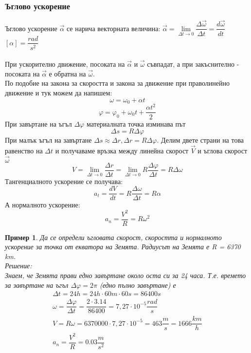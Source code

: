 \documentclass[fleqn, 12pt]{article}
\newtheorem{example}{Пример}[subsection]
\begin{document}
\subsubsection{Ъглово ускорение}
Ъглово ускорение $\vec{\alpha}$ се нарича векторната величина: $\vec{\alpha} = \lim\limits_{\Delta t \rightarrow 0} \dfrac{\Delta \vec{\omega}}{\Delta t} = \dfrac{d \vec{\omega}}{dt} $ \\
$\left[ \alpha \right] = \dfrac{rad}{s^2}$\\
\\
При ускорително движение, посоката на $\vec{\alpha}$ и $\vec{\omega}$ съвпадат, а при закъснително - посоката на $\vec{\alpha}$ е обратна на $\vec{\omega}$. \\
По подобие на закона за скоростта и закона за движение при праволинейно движение и тук можем да напишем:
$$\omega = \omega_0 + \alpha t$$
$$\varphi = \varphi_0 + \omega_0t + \dfrac{\alpha t^2}{2}$$
При завъртане на ъгъл $\Delta \varphi$ материалната точка изминава път
$$\Delta s = R\Delta \varphi$$
При малък ъгъл на завъртане $\Delta s \approx \Delta r, \Delta r =  R\Delta \varphi$.  Делим двете страни на това равенство на $\Delta t$ и получаваме връзка между линейна скорост $\vec{V}$ и ъглова скорост $\vec{\omega}$
$$V = \lim\limits_{\Delta t \rightarrow 0} \dfrac{\Delta r}{\Delta t} = \lim\limits_{\Delta t \rightarrow 0} R \dfrac{\Delta \varphi}{\Delta t} = R \Delta \omega$$
Тангенциалното ускорение се получава: 
$$a_t = \dfrac{dV}{dt} = R \dfrac{\Delta \omega}{\Delta t} = R \alpha$$
А нормалното ускорение: 
$$a_n = \dfrac{V^2}{R} = R \omega^2$$

\begin{example}
Да се определи ъгловата скорост, скоростта и нормалното ускорение за точка от екватора на Земята. Радиусът на Земята е R = 6370 km.\\
Решение: \\
Знаем, че Земята прави едно завъртане около оста си за 24 часа. Т.е. времето за завъртане на ъгъл $\Delta \varphi = 2 \pi$ (едно пълно завъртане) е 
\begin{gather*}
\Delta t = 24h = 24h \cdot 60m \cdot 60s = 86400 s\\
\omega =  \dfrac{\Delta \varphi}{\Delta t} =  \dfrac{2 \cdot 3.14}{86400} = 7,27 \cdot 10^{-5} \dfrac{rad}{s}\\
V = R\omega = 6370000 \cdot  7,27 \cdot 10^{-5} = 463 \dfrac{m}{s} = 1666 \dfrac{km}{h} \\
a_n = \dfrac{V^2}{R} = 0.03 \dfrac{m}{s^2}
\end{gather*}
\end{example}
\end{document}
